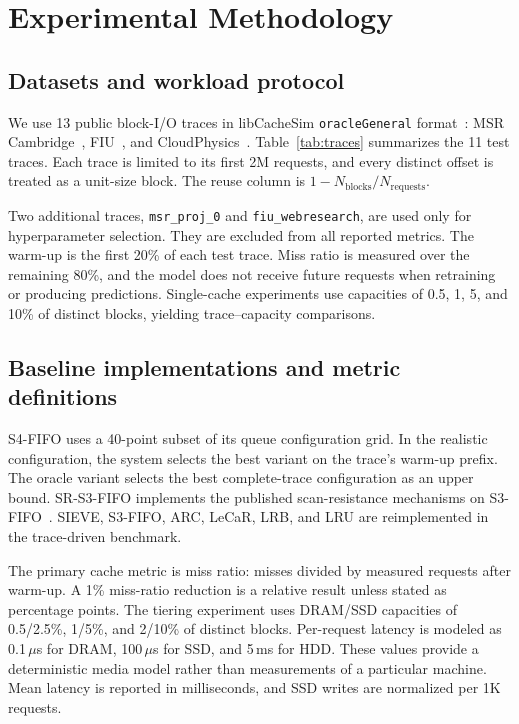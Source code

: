 \documentclass[conference]{IEEEtran}
\newcommand{\us}{\ensuremath{\mu}s}
\begin{document}
\section{Experimental Methodology}
\subsection{Datasets and workload protocol}
We use 13 public block-I/O traces in libCacheSim \texttt{oracleGeneral} format~\cite{twitter}: MSR Cambridge~\cite{msr}, FIU~\cite{fiu}, and CloudPhysics~\cite{shards}. Table~\ref{tab:traces} summarizes the 11 test traces. Each trace is limited to its first 2M requests, and every distinct offset is treated as a unit-size block. The reuse column is $1-N_\text{blocks}/N_\text{requests}$.

\begin{table}[t]
\centering
\caption{Test traces (first 2M requests).}
\label{tab:traces}
\scriptsize
\end{table}

Two additional traces, \texttt{msr\_proj\_0} and \texttt{fiu\_webresearch}, are used only for hyperparameter selection. They are excluded from all reported metrics. The warm-up is the first 20\% of each test trace. Miss ratio is measured over the remaining 80\%, and the model does not receive future requests when retraining or producing predictions. Single-cache experiments use capacities of 0.5, 1, 5, and 10\% of distinct blocks, yielding \nConfigs{} trace--capacity comparisons.

\subsection{Baseline implementations and metric definitions}
S4-FIFO uses a 40-point subset of its queue configuration grid. In the realistic configuration, the system selects the best variant on the trace's warm-up prefix. The oracle variant selects the best complete-trace configuration as an upper bound. SR-S3-FIFO implements the published scan-resistance mechanisms on S3-FIFO~\cite{srgadgets,s3fifo}. SIEVE, S3-FIFO, ARC, LeCaR, LRB, and LRU are reimplemented in the trace-driven benchmark.

The primary cache metric is miss ratio: misses divided by measured requests after warm-up. A 1\% miss-ratio reduction is a relative result unless stated as percentage points. The tiering experiment uses DRAM/SSD capacities of 0.5/2.5\%, 1/5\%, and 2/10\% of distinct blocks. Per-request latency is modeled as 0.1\,\us{} for DRAM, 100\,\us{} for SSD, and 5\,ms for HDD. These values provide a deterministic media model rather than measurements of a particular machine. Mean latency is reported in milliseconds, and SSD writes are normalized per 1K requests.
\end{document}
